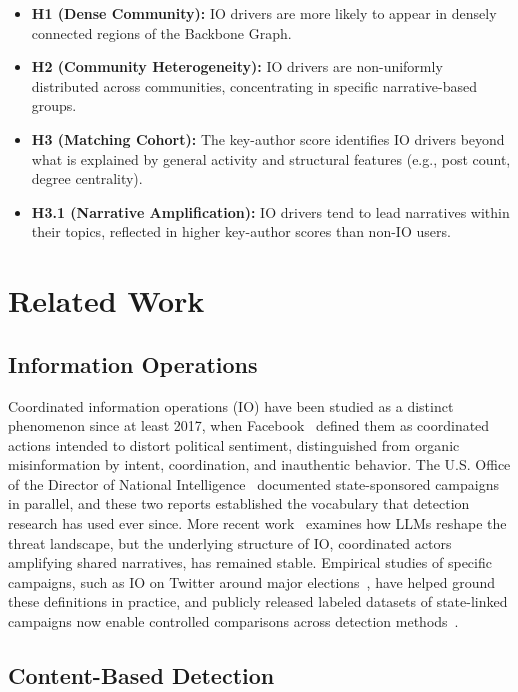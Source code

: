 \documentclass[10pt,journal,compsoc]{IEEEtran}
\begin{document}
\begin{itemize}
    \item \textbf{H1 (Dense Community):} IO drivers are more likely to appear in densely connected regions of the Backbone Graph.
    \item \textbf{H2 (Community Heterogeneity):} IO drivers are non-uniformly distributed across communities, concentrating in specific narrative-based groups.
    \item \textbf{H3 (Matching Cohort):} The key-author score identifies IO drivers beyond what is explained by general activity and structural features (e.g., post count, degree centrality).
    \item \textbf{H3.1 (Narrative Amplification):} IO drivers tend to lead narratives within their topics, reflected in higher key-author scores than non-IO users.
\end{itemize}



\section{Related Work}

\subsection{Information Operations}

Coordinated information operations (IO) have been studied as a distinct phenomenon since at least 2017, when Facebook~\cite{weedon2017information} 
defined them as coordinated actions intended to distort political sentiment, distinguished from organic misinformation by intent, coordination, and 
inauthentic behavior. The U.S. Office of the Director of National Intelligence~\cite{activities2017intentions} documented state-sponsored campaigns in parallel, and these two reports established the vocabulary that detection research has used ever since. More recent
work~\cite{fredheim2025assessing,zaman2025social} examines how LLMs reshape the threat landscape, but the underlying structure of IO, coordinated actors
amplifying shared narratives, has remained stable. Empirical studies of specific campaigns, such as IO on Twitter around major elections~\cite{coordinated2019Twitter}, have helped ground these definitions in practice, and publicly released labeled datasets of state-linked campaigns now enable controlled comparisons across detection methods~\cite{seckin2025labeled}.


\subsection{Content-Based Detection}
\end{document}

